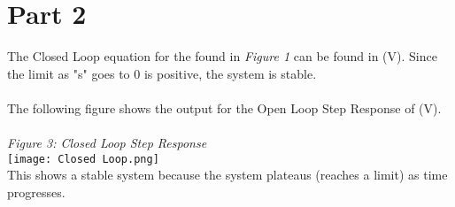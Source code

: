 \documentclass[12pt,a4paper]{article}
\begin{document}
\section{Part 2}
The Closed Loop equation for the found in \textit{Figure 1} can be found in (V). Since the limit as "s" goes to 0 is positive, the system is stable.\\
\\
The following figure shows the output for the Open Loop Step Response of (V).\\
\\
\textit{Figure 3: Closed Loop Step Response}
\\
\texttt{[image: Closed Loop.png]}
\\
This shows a stable system because the system plateaus (reaches a limit) as time progresses.
\end{document}
